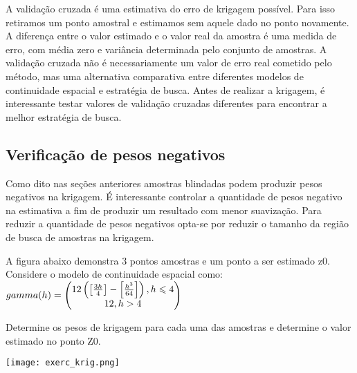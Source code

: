 A validação cruzada é uma estimativa do erro de krigagem possível. Para isso retiramos um ponto amostral e estimamos sem aquele dado no ponto novamente. A diferença entre o valor estimado e o valor real da amostra é uma medida de erro, com média zero e variância determinada pelo conjunto de amostras. A validação cruzada não é necessariamente um valor de erro real cometido pelo método, mas uma alternativa comparativa entre diferentes modelos de continuidade espacial e estratégia de busca. Antes de realizar a krigagem, é interessante testar valores de validação cruzadas diferentes para encontrar a melhor estratégia de busca. 

\subsection{Verificação de pesos negativos}

Como dito nas seções anteriores amostras blindadas podem produzir pesos negativos na krigagem. É interessante controlar a quantidade de pesos negativo na estimativa a fim de produzir um resultado com menor suavização. Para reduzir a quantidade de pesos negativos opta-se por reduzir o tamanho da região de busca de amostras na krigagem. 

\begin{exercise}
	A figura abaixo demonstra 3 pontos amostras e um ponto a ser estimado z0. Considere o modelo de continuidade espacial como: \\
	
	\vspace{0.5cm}
	 $\\gamma (h) = \begin{pmatrix}
	12\left(\left [ \frac{3h}{4} \right ]-\left [ \frac{h^{3}}{64} \right ]\right), h\leqslant 4\\
	12,h> 4
	
	\end{pmatrix}$
	\vspace{0.5cm}
	
	Determine os pesos de krigagem para cada uma das amostras e determine o valor estimado no ponto Z0.
	
	\vspace{0.5cm}
	
	\centering
	\texttt{[image: exerc\_krig.png]}
\end{exercise}